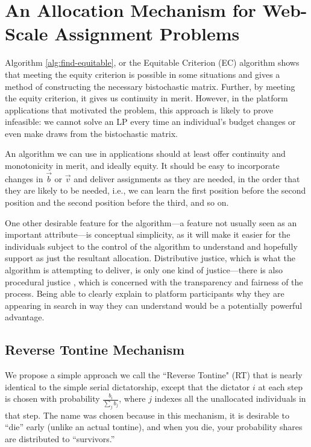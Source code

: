 \documentclass[prodmode,acmec]{acmsmall}
\begin{document}
\section{An Allocation Mechanism for Web-Scale Assignment Problems} 
Algorithm \ref{alg:find-equitable}, or the Equitable Criterion (EC)
algorithm shows that meeting the equity criterion is possible in some
situations and gives a method of constructing the necessary
bistochastic matrix. Further, by meeting the equity criterion, it
gives us continuity in merit. However, in the platform applications
that motivated the problem, this approach is likely to prove
infeasible: we cannot solve an LP every time an individual's budget
changes or even make draws from the bistochastic matrix.

An algorithm we can use in applications should at least offer
continuity and monotonicity in merit, and ideally equity. It should be
easy to incorporate changes in $\vec{b}$ or $\vec{v}$ and deliver
assignments as they are needed, in the order that they are likely to
be needed, i.e., we can learn the first position before the second
position and the second position before the third, and so on.

One other desirable feature for the algorithm---a feature not usually
seen as an important attribute---is conceptual simplicity, as it will
make it easier for the individuals subject to the control of the
algorithm to understand and hopefully support as just the resultant
allocation. Distributive justice, which is what the algorithm is
attempting to deliver, is only one kind of justice---there is also
procedural justice \cite{rawls1999theory}, which is concerned with the
transparency and fairness of the process. Being able to clearly
explain to platform participants why they are appearing in search in
way they can understand would be a potentially powerful advantage.

\subsection{Reverse Tontine Mechanism}
\label{sec:tontine}
We propose a simple approach we call the ``Reverse Tontine" (RT) that
is nearly identical to the simple serial dictatorship, except that the
dictator $i$ at each step is chosen with probability
$\frac{b_i}{\sum_j b_j}$, where $j$ indexes all the unallocated
individuals in that step. The name was chosen because in this
mechanism, it is desirable to ``die'' early (unlike an actual
tontine), and when you die, your probability shares are distributed to
``survivors.''
\end{document}
